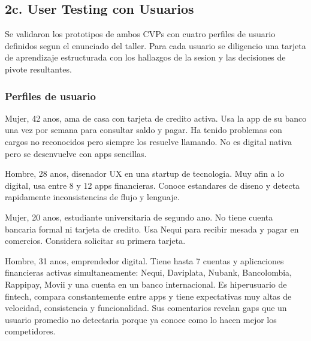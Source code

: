 \documentclass[12pt,a4paper]{article}
\begin{document}
\subsection{2c. User Testing con Usuarios}

Se validaron los prototipos de ambos CVPs con cuatro perfiles de usuario
definidos segun el enunciado del taller. Para cada usuario se diligencio una
tarjeta de aprendizaje estructurada con los hallazgos de la sesion y las
decisiones de pivote resultantes.

\subsubsection{Perfiles de usuario}

\begin{description}[leftmargin=*, style=nextline]
  \item[\textbf{Perfil 1 --- Cliente de banco normal}]
    Mujer, 42 anos, ama de casa con tarjeta de credito activa. Usa la app de
    su banco una vez por semana para consultar saldo y pagar. Ha tenido
    problemas con cargos no reconocidos pero siempre los resuelve llamando.
    No es digital nativa pero se desenvuelve con apps sencillas.
  \item[\textbf{Perfil 2 --- Experto digital}]
    Hombre, 28 anos, disenador UX en una startup de tecnologia. Muy afin a lo
    digital, usa entre 8 y 12 apps financieras. Conoce estandares de diseno y
    detecta rapidamente inconsistencias de flujo y lenguaje.
  \item[\textbf{Perfil 3 --- Potencial cliente}]
    Mujer, 20 anos, estudiante universitaria de segundo ano. No tiene cuenta
    bancaria formal ni tarjeta de credito. Usa Nequi para recibir mesada y
    pagar en comercios. Considera solicitar su primera tarjeta.
  \item[\textbf{Perfil 4 --- Usuario extremo}]
    Hombre, 31 anos, emprendedor digital. Tiene hasta 7 cuentas y aplicaciones
    financieras activas simultaneamente: Nequi, Daviplata, Nubank, Bancolombia,
    Rappipay, Movii y una cuenta en un banco internacional. Es hiperusuario de
    fintech, compara constantemente entre apps y tiene expectativas muy altas de
    velocidad, consistencia y funcionalidad. Sus comentarios revelan gaps que un
    usuario promedio no detectaria porque ya conoce como lo hacen mejor los
    competidores.
\end{description}
\end{document}
